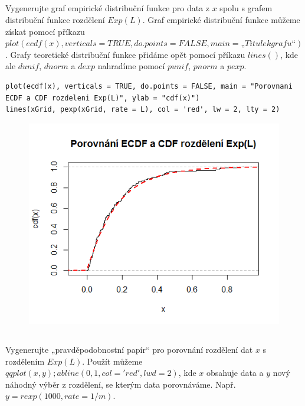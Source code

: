 \documentclass[a4paper]{article}
\begin{document}
\subsection{}
Vygenerujte graf empirické distribuční funkce pro data z $x$ spolu s grafem distribuční funkce rozdělení $Exp(L)$. Graf empirické distribuční funkce můžeme získat pomocí příkazu $plot(ecdf(x), verticals=TRUE, do.points = FALSE, main=„Titulek grafu“)$. Grafy teoretické distribuční funkce přidáme opět pomocí příkazu $lines()$, kde ale $dunif$, $dnorm$ a $dexp$ nahradíme pomocí $punif$, $pnorm$ a $pexp$.

\lstset{language = r, numbers=left, tabsize = 4, title=Řešení, basicstyle=\footnotesize}
\begin{lstlisting}[firstnumber=14]
plot(ecdf(x), verticals = TRUE, do.points = FALSE, main = "Porovnani ECDF a CDF rozdeleni Exp(L)", ylab = "cdf(x)")
lines(xGrid, pexp(xGrid, rate = L), col = 'red', lw = 2, lty = 2)
\end{lstlisting}

\begin{figure}[h]
\begin{center}
	\includegraphics{ecdf.png}
\end{center}
\end{figure}

\subsection{}
Vygenerujte „pravděpodobnostní papír“ pro porovnání rozdělení dat $x$ s rozdělením $Exp(L)$. Použít můžeme $qqplot(x, y); abline(0,1, col='red', lwd=2)$, kde $x$ obsahuje data a $y$ nový náhodný výběr z rozdělení, se kterým data porovnáváme. Např. $y=rexp(1000, rate=1/m)$.
\end{document}
